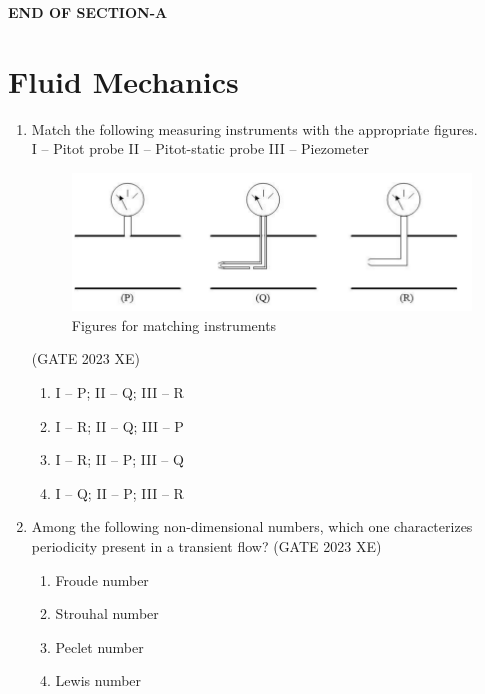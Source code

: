 \documentclass[journal,12pt,onecolumn]{IEEEtran}
\begin{document}
\begin{center}

\item[\textbf{END OF SECTION-A}]

\end{center}


\newpage

\section*{Fluid Mechanics}
\bigskip

\begin{enumerate}

\item Match the following measuring instruments with the appropriate figures.\\
I – Pitot probe \quad II – Pitot-static probe \quad III – Piezometer

\begin{figure}[htbp]
\centering
\includegraphics[width=0.8\columnwidth]{figs/B/fig1.png}
\caption{Figures for matching instruments}
\label{fig:figs/Bfig1.png}
\end{figure}
\hfill{(GATE 2023 XE)}

\begin{multicols}{2}
\begin{enumerate}
\item I – P; II – Q; III – R
\item I – R; II – Q; III – P
\item I – R; II – P; III – Q
\item I – Q; II – P; III – R
\end{enumerate}
\end{multicols}

\item Among the following non-dimensional numbers, which one characterizes periodicity
present in a transient flow?
\hfill{(GATE 2023 XE)}
\begin{multicols}{2}
\begin{enumerate}
\item Froude number
\item Strouhal number
\item Peclet number
\item Lewis number
\end{enumerate}
\end{multicols}


\end{enumerate}
\end{document}
